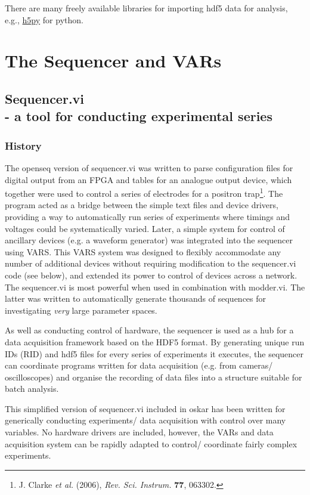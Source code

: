 \documentclass[10pt,a4paper]{article}
\begin{document}
There are many freely available libraries for importing hdf5 data for analysis, e.g., \href{http://www.h5py.org/}{h5py} for python.

\section{The Sequencer and VARs}
\subsection[Sequencer.vi]{\label{sex:seq}Sequencer.vi \\ %
	\normalsize - a tool for conducting experimental series}

\subsubsection{History}
The openseq version of sequencer.vi was written to parse configuration files for digital output from an FPGA and tables for an analogue output device, which together were used to control a series of electrodes for a positron trap\footnote{J. Clarke \emph{et al.} (2006), \emph{Rev. Sci. Instrum.} \textbf{77}, 063302.}.  The program acted as a bridge between the simple text files and device drivers, providing a way to automatically run series of experiments where timings and voltages could be systematically varied. Later, a simple system for control of ancillary devices (e.g. a waveform generator) was integrated into the sequencer using VARS.  This VARS system was designed to flexibly accommodate any number of additional devices without requiring modification to the sequencer.vi code  (see below), and extended its power to control of devices across a network.  The sequencer.vi is most powerful when used in combination with modder.vi.  The latter was written to automatically generate thousands of sequences for investigating \emph{very} large parameter spaces. 

As well as conducting control of hardware, the sequencer is used as a hub for a data acquisition framework based on the HDF5 format.  By generating unique run IDs (RID) and hdf5 files for every series of experiments it executes, the sequencer can coordinate programs written for data acquisition (e.g. from cameras/ oscilloscopes) and organise the recording of data files into a structure suitable for batch analysis.

This simplified version of sequencer.vi included in oskar has been written for generically conducting experiments/ data acquisition with control over many variables.   No hardware drivers are included, however, the VARs and data acquisition system can be rapidly adapted to control/ coordinate fairly complex experiments.
\end{document}
